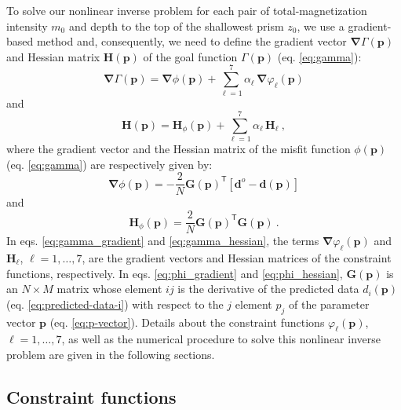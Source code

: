 To solve our nonlinear inverse problem for each pair of total-magnetization 
intensity $m_{0}$ and depth to the top of the shallowest prism $z_{0}$, 
we use a gradient-based method and, consequently, we need to define the gradient vector 
$\boldsymbol{\nabla}\Gamma(\mathbf{p})$ and Hessian matrix $\mathbf{H}(\mathbf{p})$ of 
the goal function $\Gamma(\mathbf{p})$ (eq. \ref{eq:gamma}):
\begin{equation}\label{eq:gamma_gradient}
\boldsymbol{\nabla}\Gamma (\mathbf{p}) = \boldsymbol{\nabla}\phi (\mathbf{p}) + 
\sum\limits^{7}_{\ell =1} \alpha_{\ell} \, \boldsymbol{\nabla}\varphi_{\ell}(\mathbf{p})
\end{equation}
and
\begin{equation}\label{eq:gamma_hessian}
\mathbf{H} (\mathbf{p}) = \mathbf{H}_\phi (\mathbf{p}) + \sum\limits^{7}_{\ell =1} \alpha_{\ell} \, \mathbf{H}_\ell \: ,
\end{equation}
where the gradient vector and the Hessian matrix of the misfit function 
$\phi(\mathbf{p})$ (eq. \ref{eq:gamma}) are respectively given by:
\begin{equation}\label{eq:phi_gradient}
\boldsymbol{\nabla} \phi(\mathbf{p}) = - \frac{2}{N}\mathbf{G}(\mathbf{p})^{\mathsf{T}}[\mathbf{d}^o - \mathbf{d}(\mathbf{p})]
\end{equation} 
and 
\begin{equation}\label{eq:phi_hessian}
\mathbf{H}_{\phi}(\mathbf{p}) = \frac{2}{N}\mathbf{G}(\mathbf{p})^{\mathsf{T}}\mathbf{G}(\mathbf{p}) \: .
\end{equation}
In eqs. \ref{eq:gamma_gradient} and \ref{eq:gamma_hessian}, the terms 
$\boldsymbol{\nabla} \varphi_{\ell}(\mathbf{p})$ and $\mathbf{H}_{\ell}$, 
$\ell = 1, \dots, 7$, are the gradient vectors and Hessian matrices of the constraint functions, respectively. In eqs. \ref{eq:phi_gradient} and \ref{eq:phi_hessian},
$\mathbf{G}(\mathbf{p})$ is an $N \times M$ matrix whose element $ij$ is the derivative of the predicted data $d_{i}(\mathbf{p})$ (eq. \ref{eq:predicted-data-i}) with respect to the $j$ element $p_{j}$ of 
the parameter vector $\mathbf{p}$ (eq. \ref{eq:p-vector}). Details about the constraint functions $\varphi_\ell(\mathbf{p})$, $\ell = 1, \dots, 7$, as well as the numerical procedure to solve this nonlinear inverse problem are given in the following sections.

\subsection{Constraint functions}\label{sec:constraints}

